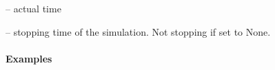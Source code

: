 \documentclass[letterpaper,10pt,english]{sphinxmanual}
\begin{document}
\begin{fulllineitems}
\begin{fulllineitems}
\end{fulllineitems}


\begin{fulllineitems}
\label{\detokenize{triflow.core:triflow.core.simulation.Simulation.t}}
 -- actual time

\end{fulllineitems}


\begin{fulllineitems}
\label{\detokenize{triflow.core:triflow.core.simulation.Simulation.tmax}}
 -- stopping time of the simulation. Not stopping if set to None.

\end{fulllineitems}

\paragraph{Examples}


\end{fulllineitems}
\end{document}
